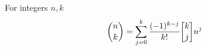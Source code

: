 % 

% 

% 

% 

\begin{lemma}
  For integers $n,k$
  \begin{align*}
    \binom{n}{k}
    = \sum_{j=0}^{k} \frac{(-1)^{k-j}}{k!} \stirlingi{k}{j} n^j
  \end{align*}
\end{lemma}

% 

% 

% 

% 

